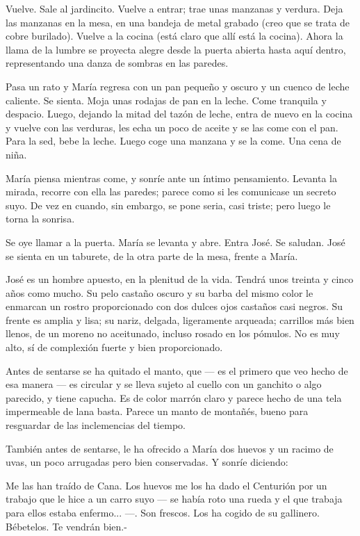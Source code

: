 \documentclass[12pt, twoside, openright]{book} %
\begin{document}
Vuelve. Sale al jardincito. Vuelve a entrar; trae unas manzanas y verdura. Deja las manzanas en la mesa, en una bandeja de metal grabado (creo que se trata de cobre burilado). Vuelve a la cocina (está claro que allí está la cocina). Ahora la llama de la lumbre se proyecta alegre desde la puerta abierta hasta aquí dentro, representando una danza de sombras en las paredes. 

Pasa un rato y María regresa con un pan pequeño y oscuro y un cuenco de leche caliente. Se sienta. Moja unas rodajas de pan en la leche. Come tranquila y despacio. Luego, dejando la mitad del tazón de leche, entra de nuevo en la cocina y vuelve con las verduras, les echa un poco de aceite y se las come con el pan. Para la sed, bebe la leche. Luego coge una manzana y se la come. Una cena de niña. 

María piensa mientras come, y sonríe ante un íntimo pensamiento. Levanta la mirada, recorre con ella las paredes; parece como si les comunicase un secreto suyo. De vez en cuando, sin embargo, se pone seria, casi triste; pero luego le torna la sonrisa. 

Se oye llamar a la puerta. María se levanta y abre. Entra José. Se saludan. José se sienta en un taburete, de la otra parte de la mesa, frente a María. 

José es un hombre apuesto, en la plenitud de la vida. Tendrá unos treinta y cinco años como mucho. Su pelo castaño oscuro y su barba del mismo color le enmarcan un rostro proporcionado con dos dulces ojos castaños casi negros. Su frente es amplia y lisa; su nariz, delgada, ligeramente arqueada; carrillos más bien llenos, de un moreno no aceitunado, incluso rosado en los pómulos. No es muy alto, sí de complexión fuerte y bien proporcionado. 

Antes de sentarse se ha quitado el manto, que — es el primero que veo hecho de esa manera — es circular y se lleva sujeto al cuello con un ganchito o algo parecido, y tiene capucha. Es de color marrón claro y parece hecho de una tela impermeable de lana basta. Parece un manto de montañés, bueno para resguardar de las inclemencias del tiempo. 

También antes de sentarse, le ha ofrecido a María dos huevos y un racimo de uvas, un poco arrugadas pero bien conservadas. Y sonríe diciendo: 

Me las han traído de Cana. Los huevos me los ha dado el Centurión por un trabajo que le hice a un carro suyo — se había roto una rueda y el que trabaja para ellos estaba enfermo... —. Son frescos. Los ha cogido de su gallinero. Bébetelos. Te vendrán bien.- 
\end{document}
